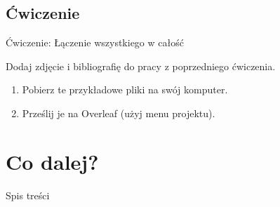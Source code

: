\documentclass{beamer}
\begin{document}
\subsection{Ćwiczenie}
\begin{frame}[fragile]{Ćwiczenie: Łączenie wszystkiego w całość}

Dodaj zdjęcie i bibliografię do pracy z poprzedniego ćwiczenia.

\begin{enumerate}
\item Pobierz te przykładowe pliki na swój komputer.

\begin{center}

\end{center}

\item Prześlij je na Overleaf (użyj menu projektu).

\end{enumerate}
\end{frame}

\section{Co dalej?}

\begin{frame}{Spis treści}
\begin{multicols}{2}
\tableofcontents[currentsection]
\end{multicols}
\end{frame}

\end{document}
